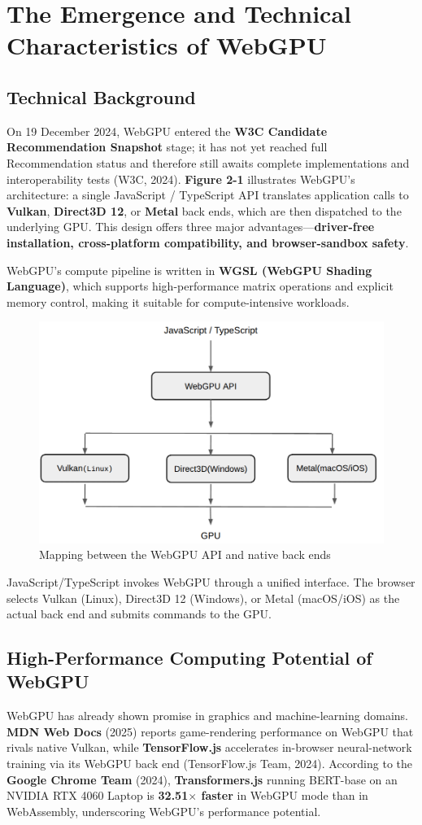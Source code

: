 \documentclass[PhD]{PHlab-thesis}
\begin{document}
\section{The Emergence and Technical Characteristics of WebGPU}
\subsection{Technical Background}
On 19 December 2024, WebGPU entered the \textbf{W3C Candidate Recommendation Snapshot} stage; it has not yet reached full Recommendation status and therefore still awaits complete implementations and interoperability tests (W3C, 2024). \textbf{Figure 2-1} illustrates WebGPU’s architecture: a single JavaScript / TypeScript API translates application calls to \textbf{Vulkan}, \textbf{Direct3D 12}, or \textbf{Metal} back ends, which are then dispatched to the underlying GPU. This design offers three major advantages—\textbf{driver-free installation, cross-platform compatibility, and browser-sandbox safety}.

WebGPU’s compute pipeline is written in \textbf{WGSL (WebGPU Shading Language)}, which supports high-performance matrix operations and explicit memory control, making it suitable for compute-intensive workloads.

\begin{figure}[htbp]
    \centering
    \includegraphics[width=0.7\linewidth]{WebGPU 架構對應示意.png}
    \caption{Mapping between the WebGPU API and native back ends}
    \label{fig:webgpu-mapping}
\end{figure}

JavaScript/TypeScript invokes WebGPU through a unified interface. The browser selects Vulkan (Linux), Direct3D 12 (Windows), or Metal (macOS/iOS) as the actual back end and submits commands to the GPU.

\subsection{High-Performance Computing Potential of WebGPU}
WebGPU has already shown promise in graphics and machine-learning domains. \textbf{MDN Web Docs} (2025) reports game-rendering performance on WebGPU that rivals native Vulkan, while \textbf{TensorFlow.js} accelerates in-browser neural-network training via its WebGPU back end (TensorFlow.js Team, 2024). According to the \textbf{Google Chrome Team} (2024), \textbf{Transformers.js} running BERT-base on an NVIDIA RTX 4060 Laptop is \textbf{32.51$\times$ faster} in WebGPU mode than in WebAssembly, underscoring WebGPU’s performance potential.
\end{document}

